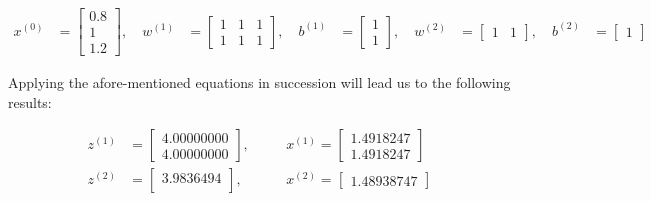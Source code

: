 \documentclass[12pt]{article}
\begin{document}
\begin{enumerate}[leftmargin=\labelsep]
        \begin{equation*}
          \begin{aligned}
            x^{(0)} & = \begin{bmatrix}
                          0.8 \\
                          1   \\
                          1.2
                        \end{bmatrix}, \quad
            w^{(1)} & = \begin{bmatrix}
                          1 & 1 & 1 \\
                          1 & 1 & 1
                        \end{bmatrix}, \quad
            b^{(1)} & = \begin{bmatrix}
                          1 \\
                          1
                        \end{bmatrix}, \quad
            w^{(2)} & = \begin{bmatrix}
                          1 & 1
                        \end{bmatrix}, \quad
            b^{(2)} & = \begin{bmatrix}
                          1
                        \end{bmatrix}
          \end{aligned}
        \end{equation*}

        Applying the afore-mentioned equations in succession will lead us to the following results:


        \begin{equation*}
          \begin{aligned}
            z^{(1)} & = \begin{bmatrix}
                          4.00000000 \\
                          4.00000000
                        \end{bmatrix}, \quad
                    &                      & x^{(1)} = \begin{bmatrix}
                                                         1.4918247 \\
                                                         1.4918247
                                                       \end{bmatrix} \\
            z^{(2)} & = \begin{bmatrix}
                          3.9836494 \\
                        \end{bmatrix}, \quad
                    &                      & x^{(2)} = \begin{bmatrix}
                                                         1.48938747
                                                       \end{bmatrix}
          \end{aligned}
        \end{equation*}


\end{enumerate}
\end{document}
